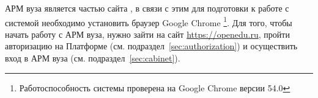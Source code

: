 АРМ вуза является частью сайта , 
в связи с этим для подготовки к работе с системой необходимо установить браузер Google Chrome%
\footnote{Работоспособность системы проверена на Google Chrome версии 54.0}.
Для того, чтобы начать работу с АРМ вуза, нужно зайти на сайт  \url{https://openedu.ru},
пройти авторизацию на Платформе (см. подраздел~\ref{sec:authorization}) и осуществить вход в АРМ вуза 
(см. подраздел~\ref{sec:cabinet}). 